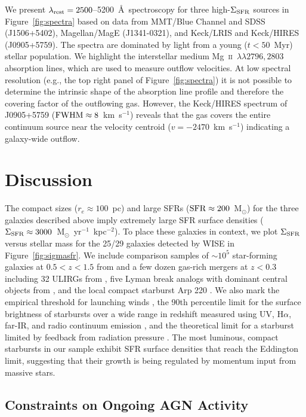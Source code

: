 \documentclass[apj]{emulateapj}
\newcommand{\kms}{km~s$^{-1}$}
\newcommand{\mgii}{\textrm{Mg}~\textsc{ii}}
\newcommand{\msun}{M$_{\odot}$}
\newcommand{\units}{M$_{\odot}$~yr$^{-1}$~kpc$^{-2}$}
\newcommand{\lrest}{\lambda_{\textnormal{\scriptsize{rest}}}}
\newcommand{\sigmasfr}{\Sigma_{\textnormal{\scriptsize{SFR}}}}
\begin{document}
We present $\lrest=2500$--5200~\AA\ spectroscopy for three
high-$\sigmasfr$ sources in Figure~\ref{fig:spectra} based on data
from MMT/Blue Channel and SDSS (J1506+5402), Magellan/MagE
(J1341-0321), and Keck/LRIS and Keck/HIRES (J0905+5759).  The spectra
are dominated by light from a young ($t<50$~Myr) stellar population.
We highlight the interstellar medium \mgii~$\lambda\lambda2796,2803$
absorption lines, which are used to measure outflow velocities.  At
low spectral resolution (e.g., the top right panel of
Figure~\ref{fig:spectra}) it is not possible to determine the
intrinsic shape of the absorption line profile and therefore the
covering factor of the outflowing gas.  However, the Keck/HIRES
spectrum of J0905+5759 ($\textnormal{FWHM}\approx8$~\kms) reveals that
the gas covers the entire continuum source near the velocity centroid
($v=-2470$~\kms) indicating a galaxy-wide outflow.


\section{Discussion}\label{sec:discussion}

The compact sizes ($r_e\approx100$~pc) and large SFRs
($\textnormal{SFR}\approx200$~\msun) for the three galaxies described
above imply extremely large SFR surface densities
($\sigmasfr\approx3000$~\units).  To place these galaxies in context,
we plot $\sigmasfr$ versus stellar mass for the 25/29 galaxies
detected by WISE in Figure~\ref{fig:sigmasfr}.  We include comparison
samples of $\sim10^5$ star-forming galaxies at $0.5<z<1.5$ from
\citet{wuy11} and a few dozen gas-rich mergers at $z<0.3$ including 32
ULIRGs from \citet{vei06}, five Lyman break analogs with dominant
central objects from \citet{ove09}, and the local compact starburst
Arp 220 \citep{sco97, ken98, rod08}.  We also mark the empirical
threshold for launching winds
\citep[$\sigmasfr\approx0.1$~\units,][]{hec02}, the 90th percentile
limit for the surface brightness of starbursts over a wide range in
redshift measured using UV, H$\alpha$, far-IR, and radio continuum
emission \citep[$\sigmasfr\approx25$~\units\ for a Chabrier
  IMF,][]{meu97}, and the theoretical limit for a starburst limited by
feedback from radiation pressure
\citep[$\sigmasfr\approx3000$~\units,][]{mur05,tho05,hop10}.  The most
luminous, compact starbursts in our sample exhibit SFR surface
densities that reach the Eddington limit, suggesting that their growth
is being regulated by momentum input from massive stars.


\subsection{Constraints on Ongoing AGN Activity}
\end{document}
